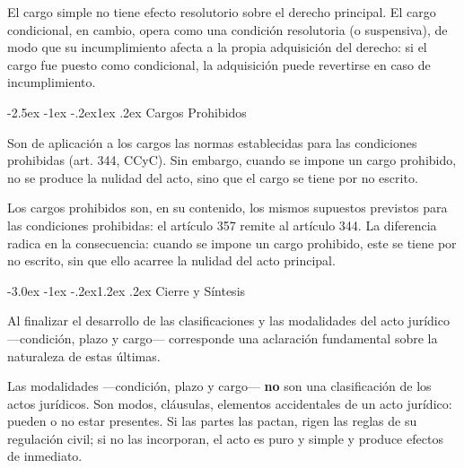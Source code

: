 \documentclass[12pt,oneside]{book}
\makeatletter
\renewcommand\section{\@startsection{section}{1}{\z@}%
  {-3.0ex \@plus -1ex \@minus -.2ex}{1.2ex \@plus .2ex}%
  {\normalfont\large\bfseries\color{acento}}}
\renewcommand\subsection{\@startsection{subsection}{2}{\z@}%
  {-2.5ex \@plus -1ex \@minus -.2ex}{1ex \@plus .2ex}%
  {\normalfont\normalsize\bfseries}}
\makeatother
\begin{document}
El cargo simple no tiene efecto resolutorio sobre el derecho principal. El cargo condicional, en cambio, opera como una condición resolutoria (o suspensiva), de modo que su incumplimiento afecta a la propia adquisición del derecho: si el cargo fue puesto como condicional, la adquisición puede revertirse en caso de incumplimiento.

\subsection{Cargos Prohibidos}

\begin{regla}
Son de aplicación a los cargos las normas establecidas para las condiciones prohibidas (art. 344, CCyC). Sin embargo, cuando se impone un cargo prohibido, no se produce la nulidad del acto, sino que el cargo se tiene por no escrito.
\end{regla}

Los cargos prohibidos son, en su contenido, los mismos supuestos previstos para las condiciones prohibidas: el artículo 357 remite al artículo 344. La diferencia radica en la consecuencia: cuando se impone un cargo prohibido, este se tiene por no escrito, sin que ello acarree la nulidad del acto principal.


\section{Cierre y Síntesis}

Al finalizar el desarrollo de las clasificaciones y las modalidades del acto jurídico ---condición, plazo y cargo--- corresponde una aclaración fundamental sobre la naturaleza de estas últimas.

\begin{importante}
Las modalidades ---condición, plazo y cargo--- \textbf{no} son una clasificación de los actos jurídicos. Son modos, cláusulas, elementos accidentales de un acto jurídico: pueden o no estar presentes. Si las partes las pactan, rigen las reglas de su regulación civil; si no las incorporan, el acto es puro y simple y produce efectos de inmediato.
\end{importante}
\end{document}
